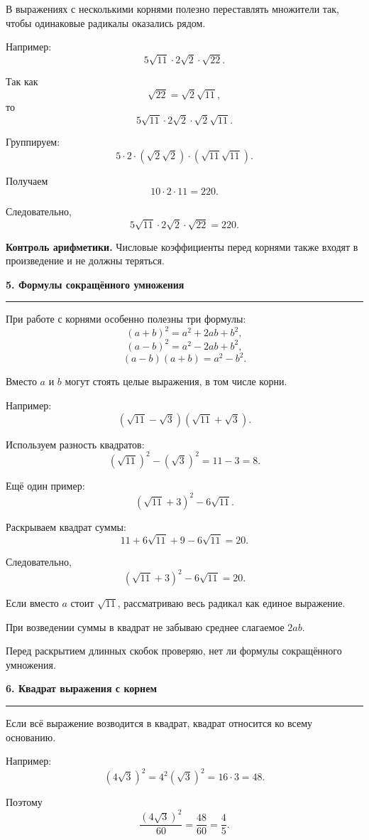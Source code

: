 \documentclass[a4paper,12pt]{article}
\newcommand{\topic}[1]{%
    \vspace{0.7em}
    {\large\bfseries\color{darkaccent}#1}\par
    \vspace{0.25em}
    {\color{rulegray}\hrule}
    \vspace{0.65em}
}
\newcommand{\important}[1]{{\bfseries\color{darkaccent}#1}}
\begin{document}
В выражениях с несколькими корнями полезно переставлять множители так, чтобы одинаковые радикалы оказались рядом.

Например:
\[
5\sqrt{11}\cdot2\sqrt2\cdot\sqrt{22}.
\]

Так как
\[
\sqrt{22}=\sqrt2\sqrt{11},
\]
то
\[
5\sqrt{11}\cdot2\sqrt2\cdot\sqrt2\sqrt{11}.
\]

Группируем:
\[
5\cdot2\cdot(\sqrt2\sqrt2)\cdot(\sqrt{11}\sqrt{11}).
\]

Получаем
\[
10\cdot2\cdot11=220.
\]

Следовательно,
\[
\boxed{5\sqrt{11}\cdot2\sqrt2\cdot\sqrt{22}=220}.
\]

\important{Контроль арифметики.}
Числовые коэффициенты перед корнями также входят в произведение и не должны теряться.

\topic{5. Формулы сокращённого умножения}

При работе с корнями особенно полезны три формулы:
\[
\boxed{(a+b)^2=a^2+2ab+b^2},
\]
\[
\boxed{(a-b)^2=a^2-2ab+b^2},
\]
\[
\boxed{(a-b)(a+b)=a^2-b^2}.
\]

Вместо \(a\) и \(b\) могут стоять целые выражения, в том числе корни.

Например:
\[
(\sqrt{11}-\sqrt3)(\sqrt{11}+\sqrt3).
\]

Используем разность квадратов:
\[
(\sqrt{11})^2-(\sqrt3)^2=11-3=8.
\]

Ещё один пример:
\[
(\sqrt{11}+3)^2-6\sqrt{11}.
\]

Раскрываем квадрат суммы:
\[
11+6\sqrt{11}+9-6\sqrt{11}=20.
\]

Следовательно,
\[
\boxed{(\sqrt{11}+3)^2-6\sqrt{11}=20}.
\]

\begin{checklist}
    \item Если вместо \(a\) стоит \(\sqrt{11}\), рассматриваю весь радикал как единое выражение.
    \item При возведении суммы в квадрат не забываю среднее слагаемое \(2ab\).
    \item Перед раскрытием длинных скобок проверяю, нет ли формулы сокращённого умножения.
\end{checklist}

\topic{6. Квадрат выражения с корнем}

Если всё выражение возводится в квадрат, квадрат относится ко всему основанию.

Например:
\[
(4\sqrt3)^2=4^2(\sqrt3)^2=16\cdot3=48.
\]

Поэтому
\[
\frac{(4\sqrt3)^2}{60}=\frac{48}{60}=\frac45.
\]
\end{document}

